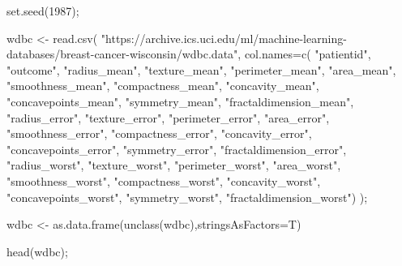 \documentclass[
]{article}
\newenvironment{Shaded}{\begin{snugshade}}{\end{snugshade}}
\newcommand{\AttributeTok}[1]{\textcolor[rgb]{0.77,0.63,0.00}{#1}}
\newcommand{\DecValTok}[1]{\textcolor[rgb]{0.00,0.00,0.81}{#1}}
\newcommand{\FunctionTok}[1]{\textcolor[rgb]{0.00,0.00,0.00}{#1}}
\newcommand{\NormalTok}[1]{#1}
\newcommand{\OtherTok}[1]{\textcolor[rgb]{0.56,0.35,0.01}{#1}}
\newcommand{\StringTok}[1]{\textcolor[rgb]{0.31,0.60,0.02}{#1}}
\begin{document}
\begin{Shaded}
\begin{Highlighting}[]
\FunctionTok{set.seed}\NormalTok{(}\DecValTok{1987}\NormalTok{);}

\NormalTok{wdbc }\OtherTok{\textless{}{-}} \FunctionTok{read.csv}\NormalTok{(}
  \StringTok{"https://archive.ics.uci.edu/ml/machine{-}learning{-}databases/breast{-}cancer{-}wisconsin/wdbc.data"}\NormalTok{,}
  \AttributeTok{col.names=}\FunctionTok{c}\NormalTok{(}
    \StringTok{"patientid"}\NormalTok{,}
    \StringTok{"outcome"}\NormalTok{,}
    \StringTok{"radius\_mean"}\NormalTok{,}
    \StringTok{"texture\_mean"}\NormalTok{,}
    \StringTok{"perimeter\_mean"}\NormalTok{,}
    \StringTok{"area\_mean"}\NormalTok{,}
    \StringTok{"smoothness\_mean"}\NormalTok{,}
    \StringTok{"compactness\_mean"}\NormalTok{,}
    \StringTok{"concavity\_mean"}\NormalTok{,}
    \StringTok{"concavepoints\_mean"}\NormalTok{,}
    \StringTok{"symmetry\_mean"}\NormalTok{,}
    \StringTok{"fractaldimension\_mean"}\NormalTok{,}
    \StringTok{"radius\_error"}\NormalTok{,}
    \StringTok{"texture\_error"}\NormalTok{,}
    \StringTok{"perimeter\_error"}\NormalTok{,}
    \StringTok{"area\_error"}\NormalTok{,}
    \StringTok{"smoothness\_error"}\NormalTok{,}
    \StringTok{"compactness\_error"}\NormalTok{,}
    \StringTok{"concavity\_error"}\NormalTok{,}
    \StringTok{"concavepoints\_error"}\NormalTok{,}
    \StringTok{"symmetry\_error"}\NormalTok{,}
    \StringTok{"fractaldimension\_error"}\NormalTok{,}
    \StringTok{"radius\_worst"}\NormalTok{,}
    \StringTok{"texture\_worst"}\NormalTok{,}
    \StringTok{"perimeter\_worst"}\NormalTok{,}
    \StringTok{"area\_worst"}\NormalTok{,}
    \StringTok{"smoothness\_worst"}\NormalTok{,}
    \StringTok{"compactness\_worst"}\NormalTok{,}
    \StringTok{"concavity\_worst"}\NormalTok{,}
    \StringTok{"concavepoints\_worst"}\NormalTok{,}
    \StringTok{"symmetry\_worst"}\NormalTok{,}
    \StringTok{"fractaldimension\_worst"}\NormalTok{)}
\NormalTok{);}

\NormalTok{wdbc }\OtherTok{\textless{}{-}} \FunctionTok{as.data.frame}\NormalTok{(}\FunctionTok{unclass}\NormalTok{(wdbc),}\AttributeTok{stringsAsFactors=}\NormalTok{T)}

\FunctionTok{head}\NormalTok{(wdbc);}
\end{Highlighting}
\end{Shaded}
\end{document}
